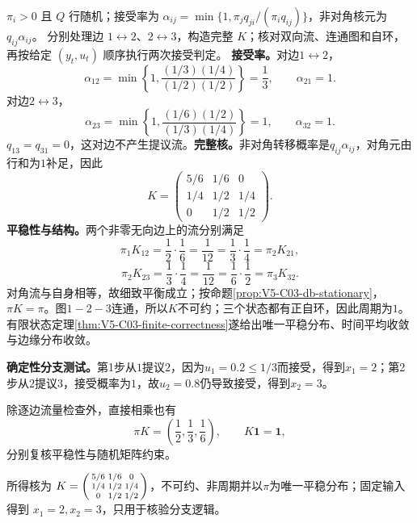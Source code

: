 \label{struct:V5-C03-CH33}
\begin{solution}
\SolGiven $\pi_i>0$ 且 $Q$ 行随机；接受率为 $\alpha_{ij}=\min\{1,\pi_jq_{ji}/(\pi_iq_{ij})\}$，非对角核元为 $q_{ij}\alpha_{ij}$。
\SolPlan 分别处理边 $1\leftrightarrow2$、$2\leftrightarrow3$，构造完整 $K$；核对双向流、连通图和自环，再按给定 $(y_t,u_t)$ 顺序执行两次接受判定。
\SolDerive
\textbf{接受率。}对边$1\leftrightarrow2$，
\[
\alpha_{12}
=\min\left\{1,\frac{(1/3)(1/4)}{(1/2)(1/2)}\right\}
=\frac13,
\qquad
\alpha_{21}=1.
\]
对边$2\leftrightarrow3$，
\[
\alpha_{23}
=\min\left\{1,\frac{(1/6)(1/2)}{(1/3)(1/4)}\right\}=1,
\qquad
\alpha_{32}=1.
\]
$q_{13}=q_{31}=0$，这对边不产生提议流。\textbf{完整核。}非对角转移概率是$q_{ij}\alpha_{ij}$，对角元由行和为$1$补足，因此
\[
K=\begin{pmatrix}
5/6&1/6&0\\
1/4&1/2&1/4\\
0&1/2&1/2
\end{pmatrix}.
\]
\textbf{平稳性与结构。}两个非零无向边上的流分别满足
\[
\pi_1K_{12}=\frac12\cdot\frac16=\frac1{12}
=\frac13\cdot\frac14=\pi_2K_{21},
\]
\[
\pi_2K_{23}=\frac13\cdot\frac14=\frac1{12}
=\frac16\cdot\frac12=\pi_3K_{32}.
\]
对角流与自身相等，故细致平衡成立；按命题\ref{prop:V5-C03-db-stationary}，$\pi K=\pi$。图$1-2-3$连通，所以$K$不可约；三个状态都有正自环，因此周期为$1$。有限状态定理\ref{thm:V5-C03-finite-correctness}遂给出唯一平稳分布、时间平均收敛与边缘分布收敛。

\textbf{确定性分支测试。}第1步从$1$提议$2$，因为$u_1=0.2\le1/3$而接受，得到$x_1=2$；第2步从$2$提议$3$，接受概率为$1$，故$u_2=0.8$仍导致接受，得到$x_2=3$。

\SolCheck 除逐边流量检查外，直接相乘也有
\[
\pi K=\left(\frac12,\frac13,\frac16\right),
\qquad K\boldsymbol1=\boldsymbol1,
\]
分别复核平稳性与随机矩阵约束。

\SolAnswer 所得核为 $K=\begin{psmallmatrix}5/6&1/6&0\\1/4&1/2&1/4\\0&1/2&1/2\end{psmallmatrix}$，不可约、非周期并以$\pi$为唯一平稳分布；固定输入得到 $x_1=2,x_2=3$，只用于核验分支逻辑。
\end{solution}

